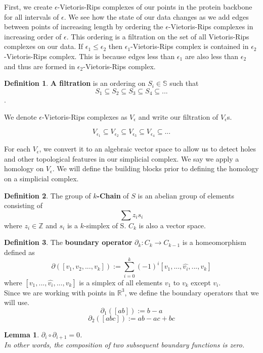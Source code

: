 \documentclass[12pt, a4paper, twocolumn, fullpage]{article}
\theoremstyle{plain}
\newtheorem{lem}[thm]{Lemma}
\theoremstyle{definition}
\newtheorem{defn}{Definition}[section]
\theoremstyle{remark}
\begin{document}
First, we create $\epsilon$-Vietoris-Rips complexes of our points in the protein backbone for all intervals of $\epsilon$. We see how the state of our data changes as we add edges between points of increasing length by ordering the $\epsilon$-Vietoris-Rips complexes in increasing order of $\epsilon$. This ordering is a filtration on the set of all Vietoris-Rips complexes on our data. If $\epsilon_1 \leq \epsilon_2$ then $\epsilon_1$-Vietoris-Rips complex is contained in  $\epsilon_2$-Vietoris-Rips complex. This is because edges less than $\epsilon_1$ are also less than $\epsilon_2$ and thus are formed in  $\epsilon_2$-Vietoris-Rips complex.

\begin{defn}
\textbf{A filtration} is an ordering on $S_i \in \mathbb{S}$ such that
$$S_1 \subseteq S_2 \subseteq S_3 \subseteq S_4 \subseteq ...$$.
\end{defn}

We denote $\epsilon$-Vietoris-Rips complexes as $V_{\epsilon}$ and write our filtration of $V_{\epsilon}$s.


 $$V_{\epsilon_1}\subseteq V_{\epsilon_2} \subseteq V_{\epsilon_3} \subseteq V_{\epsilon_4} \subseteq ...$$
 
For each $V_{\epsilon}$, we convert it to an algebraic vector space to allow us to detect holes and other topological features in our simplicial complex. We say we apply a homology on $V_{\epsilon}$. We will define the building blocks prior to defining the homology on a simplicial complex.

\begin{defn}
The group of \textbf{$k$-Chain} of $S$ is an abelian group of elements consisting of 
$$\sum z_i s_i $$ where $z_i \in \mathbb{Z}$ and $s_i$ is a $k$-simplex of S.
$C_k$ is also a vector space.
\end{defn}

\begin{defn}
The \textbf{boundary operator} $\partial_k : C_k \rightarrow C_{k-1}$ is a homeomorphism defined as
$$\partial ([v_1,v_2,...,v_k]) := \sum_{i=0}^{k} (-1)^i [v_1,...,\hat{v_i}, ...,v_k]$$
where $[v_1,...,\hat{v_i}, ...,v_k]$ is a simplex of all elements $v_1$ to $v_k$ except $v_i$.\\
Since we are working with points in $\mathbb{R}^3$, we define the boundary operators that we will use.
$$\partial_1 ([ab]) := b-a$$
$$\partial_2 ([abc]) := ab-ac+bc$$
\end{defn}

\begin{lem}
$\partial_i \circ \partial_{i+1} = 0 $.\\
In other words, the composition of two subsequent boundary functions is zero.\\
\end{lem}
\end{document}
